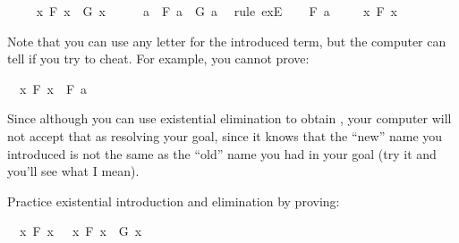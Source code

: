 \begin{isabellebody}
%
\isadelimproof
%
\endisadelimproof
%
\isatagproof
{}\isamarkupfalse%
\isanewline
\ \ \isamarkupfalse%
\ {\isachardoublequoteopen}{\isasymexists}\ x{\isachardot}\ F\ x\ {\isasymand}\ G\ x{\isachardoublequoteclose}\isanewline
\ \ \isamarkupfalse%
\ \isamarkupfalse%
\ a\ \ {\isachardoublequoteopen}F\ a\ {\isasymand}\ G\ a{\isachardoublequoteclose}\ \isamarkupfalse%
\ {\isacharparenleft}rule\ exE{\isacharparenright}\isanewline
\ \ \isamarkupfalse%
\ {\isachardoublequoteopen}F\ a{\isachardoublequoteclose}\isacommand{{\isachardot}{\isachardot}}\isamarkupfalse%
\isanewline
\ \ \isamarkupfalse%
\ {\isachardoublequoteopen}{\isasymexists}\ x{\isachardot}\ F\ x{\isachardoublequoteclose}\isacommand{{\isachardot}{\isachardot}}\isamarkupfalse%
\isanewline
{}\isamarkupfalse%
%
\endisatagproof
{\isafoldproof}%
%
\isadelimproof
%
\endisadelimproof
%
\begin{isamarkuptext}%
Note that you can use any letter for the introduced term, but the computer can tell if you
try to cheat. For example, you cannot prove:%
\end{isamarkuptext}\isamarkuptrue%
\isamarkupfalse%
\ {\isachardoublequoteopen}{\isacharparenleft}{\isasymexists}\ x{\isachardot}\ F\ x{\isacharparenright}\ {\isasymlongrightarrow}\ F\ a{\isachardoublequoteclose}%
\isadelimproof
\ %
\endisadelimproof
%
\isatagproof
{}\isamarkupfalse%
%
\endisatagproof
{\isafoldproof}%
%
\isadelimproof
%
\endisadelimproof
%
\begin{isamarkuptext}%
Since although you can use existential elimination to obtain , your computer
will not accept that as resolving your goal, since it knows that the ``new'' name you introduced is
not the same as the ``old'' name you had in your goal (try it and you'll see what I mean).%
\end{isamarkuptext}\isamarkuptrue%
%
\begin{isamarkuptext}%
\begin{Exercise} Practice existential introduction and elimination by proving: \end{Exercise}%
\end{isamarkuptext}\isamarkuptrue%
\isamarkupfalse%
\ {\isachardoublequoteopen}{\isacharparenleft}{\isasymexists}\ x{\isachardot}\ F\ x{\isacharparenright}\ {\isasymlongrightarrow}\ {\isacharparenleft}{\isasymexists}\ x{\isachardot}\ F\ x\ {\isasymor}\ G\ x{\isacharparenright}{\isachardoublequoteclose}%

\end{isabellebody}
